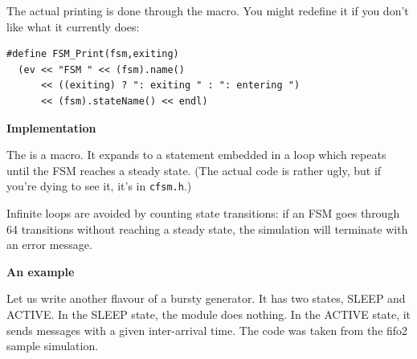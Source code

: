 The actual printing is done through the  macro. You
might redefine it if you don't like what it currently does:


\begin{verbatim}
#define FSM_Print(fsm,exiting)
  (ev << "FSM " << (fsm).name()
      << ((exiting) ? ": exiting " : ": entering ")
      << (fsm).stateName() << endl)
\end{verbatim}


\textbf{Implementation}


The  is a macro. It expands to a 
statement embedded in a  loop which repeats until the
FSM reaches a steady state. (The actual code is rather
ugly, but if you're dying to see it, it's in \texttt{cfsm.h}.)

Infinite loops are avoided by counting state transitions: if
an FSM goes through 64 transitions without reaching a steady
state, the simulation will terminate with an error message.


\textbf{An example}


Let us write another flavour of a bursty generator. It has two
states, SLEEP and ACTIVE. In the SLEEP state, the module does
nothing. In the ACTIVE state, it sends messages with a given
inter-arrival time. The code was taken from the fifo2 sample
simulation.


